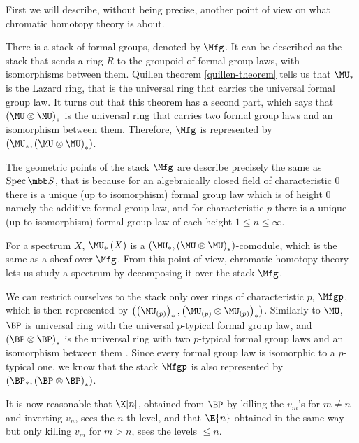 First we will describe, without being precise, another point of view on what chromatic homotopy theory is about.

There is a stack of formal groups, denoted by $\Mfg$.
It can be described as the stack that sends a ring $R$ to the groupoid of formal group laws, with isomorphisms between them.
Quillen theorem \ref{quillen-theorem} tells us that $\MU_*$ is the Lazard ring, that is the universal ring that carries the universal formal group law.
It turns out that this theorem has a second part, which says that $\left(\MU \otimes \MU\right)_*$ is the universal ring that carries two formal group laws and an isomorphism between them.
Therefore, $\Mfg$ is represented by $\left(\MU_*, \left(\MU \otimes \MU\right)_*\right)$.

The geometric points of the stack $\Mfg$ are describe precisely the same as $\spec \SS$, that is because for an algebraically closed field of characteristic $0$ there is a unique (up to isomorphism) formal group law which is of height $0$ namely the additive formal group law, and for characteristic $p$ there is a unique (up to isomorphism) formal group law of each height $1 \leq n \leq \infty$.

For a spectrum $X$, $\MU_*\left(X\right)$ is a $\left(\MU_*, \left(\MU \otimes \MU\right)_*\right)$-comodule, which is the same as a sheaf over $\Mfg$.
From this point of view, chromatic homotopy theory lets us study a spectrum by decomposing it over the stack $\Mfg$.

We can restrict ourselves to the stack only over rings of characteristic $p$, $\Mfgp$, which is then represented by $\left(\left(\MU_{\left(p\right)}\right)_*, \left(\MU_{\left(p\right)} \otimes \MU_{\left(p\right)}\right)_*\right)$. 
Similarly to $\MU$, $\BP$ is universal ring with the universal $p$-typical formal group law, and $\left(\BP \otimes \BP\right)_*$ is the universal ring with two $p$-typical formal group laws and an isomorphism between them .
Since every formal group law is isomorphic to a $p$-typical one, we know that the stack $\Mfgp$ is also represented by $\left(\BP_*, \left(\BP \otimes \BP\right)_*\right)$.

It is now reasonable that $\K[n]$, obtained from $\BP$ by killing the $v_m$'s for $m \neq n$ and inverting $v_n$, sees the $n$-th level, and that $\E{n}$ obtained in the same way but only killing $v_m$ for $m > n$, sees the levels $\leq n$.

